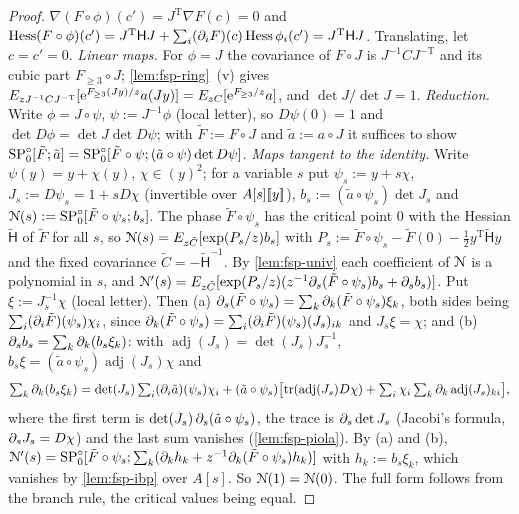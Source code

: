 \begin{proof}
$\nabla(F\circ\phi)(c')=J^{\mathrm T}\nabla F(c)=0$ and $\operatorname{Hess}(F\circ\phi)(c')=J^{\mathrm T}\mathsf HJ+\sum_i(\partial_iF)(c)\operatorname{Hess}\phi_i(c')=J^{\mathrm T}\mathsf HJ$. Translating, let $c=c'=0$.
\emph{Linear maps.} For $\phi=J$ the covariance of $F\circ J$ is $J^{-1}CJ^{-\mathrm T}$ and its cubic part $F_{\geq3}\circ J$; \cref{lem:fsp-ring}~(v) gives $E_{zJ^{-1}CJ^{-\mathrm T}}[\mathrm{e}^{F_{\geq3}(Jy)/z}a(Jy)]=E_{zC}[\mathrm{e}^{F_{\geq3}/z}a]$, and $\det J/\det J=1$.
\emph{Reduction.} Write $\phi=J\circ\psi$, $\psi:=J^{-1}\phi$ (local letter), so $D\psi(0)=1$ and $\det D\phi=\det J\det D\psi$; with $\tilde F:=F\circ J$ and $\tilde a:=a\circ J$ it suffices to show $\mathrm{SP}^{\circ}_0[\tilde F;\tilde a]=\mathrm{SP}^{\circ}_0[\tilde F\circ\psi;(\tilde a\circ\psi)\det D\psi]$.
\emph{Maps tangent to the identity.} Write $\psi(y)=y+\chi(y)$, $\chi\in(y)^2$; for a variable $s$ put $\psi_s:=y+s\chi$, $J_s:=D\psi_s=1+sD\chi$ (invertible over $A[s][\![ y ]\!]$), $b_s:=(\tilde a\circ\psi_s)\det J_s$ and $\mathcal{N}(s):=\mathrm{SP}^{\circ}_0[\tilde F\circ\psi_s;b_s]$. The phase $\tilde F\circ\psi_s$ has the critical point $0$ with the Hessian $\tilde{\mathsf H}$ of $\tilde F$ for all $s$, so $\mathcal{N}(s)=E_{z\tilde C}[\exp(P_s/z)b_s]$ with $P_s:=\tilde F\circ\psi_s-\tilde F(0)-\frac12y^{\mathrm T}\tilde{\mathsf H}y$ and the fixed covariance $\tilde C=-\tilde{\mathsf H}^{-1}$. By \cref{lem:fsp-univ} each coefficient of $\mathcal{N}$ is a polynomial in $s$, and $\mathcal{N}'(s)=E_{z\tilde C}[\exp(P_s/z)(z^{-1}\partial_s(\tilde F\circ\psi_s)b_s+\partial_sb_s)]$. Put $\xi:=J_s^{-1}\chi$ (local letter). Then (a) $\partial_s(\tilde F\circ\psi_s)=\sum_k\partial_k(\tilde F\circ\psi_s)\xi_k$, both sides being $\sum_i(\partial_i\tilde F)(\psi_s)\chi_i$, since $\partial_k(\tilde F\circ\psi_s)=\sum_i(\partial_i\tilde F)(\psi_s)(J_s)_{ik}$ and $J_s\xi=\chi$; and (b) $\partial_sb_s=\sum_k\partial_k(b_s\xi_k)$: with $\operatorname{adj}(J_s)=\det(J_s)J_s^{-1}$, $b_s\xi=(\tilde a\circ\psi_s)\operatorname{adj}(J_s)\chi$ and
\[
\textstyle\sum_k\partial_k(b_s\xi_k)=\det(J_s)\sum_i(\partial_i\tilde a)(\psi_s)\chi_i+(\tilde a\circ\psi_s)\bigl[\operatorname{tr}(\operatorname{adj}(J_s)D\chi)+\sum_i\chi_i\sum_k\partial_k\operatorname{adj}(J_s)_{ki}\bigr],
\]
where the first term is $\det(J_s)\,\partial_s(\tilde a\circ\psi_s)$, the trace is $\partial_s\det J_s$ (Jacobi's formula, $\partial_sJ_s=D\chi$) and the last sum vanishes (\cref{lem:fsp-piola}). By (a) and (b), $\mathcal{N}'(s)=\mathrm{SP}^{\circ}_0[\tilde F\circ\psi_s;\sum_k(\partial_kh_k+z^{-1}\partial_k(\tilde F\circ\psi_s)h_k)]$ with $h_k:=b_s\xi_k$, which vanishes by \cref{lem:fsp-ibp} over $A[s]$. So $\mathcal{N}(1)=\mathcal{N}(0)$. The full form follows from the branch rule, the critical values being equal.
\end{proof}

